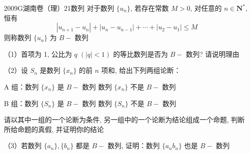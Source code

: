 
\begin{problem}{2009}{G}{湖南卷（理）}{21}{数列}
对于数列 $\{u_n\}$, 若存在常数 $M>0$, 对任意的 $n \in \mathbf{N}^*$, 恒有
$$
|u_{n+1}-u_n| + |u_n-u_{n-1}| + \cdots + |u_2-u_1| \le M
$$
则称数列 $\{u_n\}$ 为 $B-$ 数列

（1）首项为 1, 公比为 $q$ $(|q|<1)$ 的等比数列是否为 $B-$ 数列? 请说明理由

（2）设 $S_n$ 是数列 $\{x_n\}$ 的前 $n$ 项和, 给出下列两组论断：

A 组：数列 $\{x_n\}$ 是 $B-$ 数列 \hspace{2em} 数列 $\{x_n\}$ 不是 $B-$ 数列

B 组：数列 $\{S_n\}$ 是 $B-$ 数列 \hspace{2em} 数列 $\{S_n\}$ 不是 $B-$ 数列

请以其中一组的一个论断为条件, 另一组中的一个论断为结论组成一个命题, 判断所给命题的真假, 并证明你的结论

（3）若数列 $\{a_n\}, \{b_n\}$ 都是 $B-$ 数列, 证明：数列 $\{a_nb_n\}$ 也是 $B-$ 数列
\end{problem}